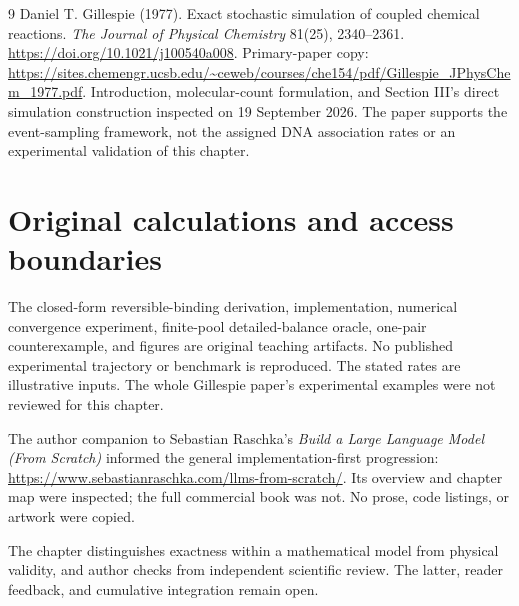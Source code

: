 \renewcommand{\bibname}{Sources and reading notes}
\begin{thebibliography}{9}
 Daniel T. Gillespie (1977).
Exact stochastic simulation of coupled chemical reactions.
\emph{The Journal of Physical Chemistry} 81(25), 2340--2361.
\url{https://doi.org/10.1021/j100540a008}.
Primary-paper copy: \url{https://sites.chemengr.ucsb.edu/~ceweb/courses/che154/pdf/Gillespie_JPhysChem_1977.pdf}.
Introduction, molecular-count formulation, and Section III's direct
simulation construction inspected on 19 September 2026.
The paper supports the event-sampling framework, not the assigned
DNA association rates or an experimental validation of this chapter.
\end{thebibliography}

\section*{Original calculations and access boundaries}
The closed-form reversible-binding derivation, implementation, numerical
convergence experiment, finite-pool detailed-balance oracle, one-pair
counterexample, and figures are original teaching artifacts.
No published experimental trajectory or benchmark is reproduced.
The stated rates are illustrative inputs. The whole Gillespie paper's
experimental examples were not reviewed for this chapter.

The author companion to Sebastian Raschka's
\emph{Build a Large Language Model (From Scratch)} informed the general
implementation-first progression:
\url{https://www.sebastianraschka.com/llms-from-scratch/}.
Its overview and chapter map were inspected; the full commercial book
was not. No prose, code listings, or artwork were copied.

The chapter distinguishes exactness within a mathematical model from
physical validity, and author checks from independent scientific review.
The latter, reader feedback, and cumulative integration remain open.
